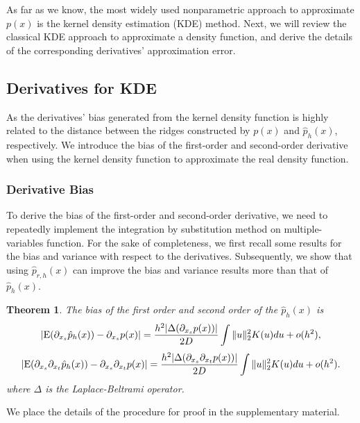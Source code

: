 \documentclass[aos,preprint]{imsart}
\newtheorem{theorem}{Theorem}[section]
\theoremstyle{remark}
\begin{document}
As far as we know, the most widely used nonparametric approach to approximate $p(x)$ is the kernel density estimation (KDE) method. Next, we will review the classical KDE approach to approximate a density function, and derive the details of the corresponding derivatives' approximation error.
\subsection{Derivatives for KDE}
As the derivatives' bias generated from the kernel density function is highly related to the distance between the ridges constructed by $p(x)$ and $\hat{p}_h(x)$, respectively. We introduce the bias of the first-order and second-order derivative when using the kernel density function to approximate the real density function.
\subsubsection{Derivative Bias}
To derive the bias of the first-order and second-order derivative, we need to repeatedly implement the integration by substitution method on multiple-variables function. For the sake of completeness, we first recall some results for the bias and variance with respect to the derivatives. Subsequently, we show that using $\hat{p}_{r,h}(x)$ can improve the bias and variance results more than that of $\hat{p}_{h}(x)$.

\begin{theorem}
The bias of the first order and second order of the $\hat{p}_h(x)$ is 
\begin{equation*}\label{BiasResult}
|{\rm E}(\partial_{x_s}  \hat{p}_h(x)) - \partial_{x_s}p(x)|  = \frac{h^2|\Delta (\partial_{x_s}p(x))|}{2D}  \int \|u\|_2^2 K(u) du+o(h^2),
\end{equation*}
\begin{equation*}\label{order2}
|{\rm E}( \partial_{x_s} \partial_{x_t}  \hat{p}_h(x)) -  \partial_{x_s} \partial_{x_t} p(x)| = \frac{h^2 |\Delta (\partial_{x_s}\partial_{x_t} p(x))|}{2D} \int \|u\|_2^2 K(u) du+o(h^2).
\end{equation*}
where $\Delta$ is the Laplace-Beltrami operator.
\end{theorem}
We place the details of the procedure for proof in the supplementary material.%
\end{document}
